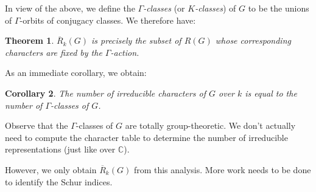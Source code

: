 \documentclass[12pt]{article}
\theoremstyle{plain}
\newtheorem{theorem}{Theorem}[section]
\newtheorem{corollary}[theorem]{Corollary}
\theoremstyle{definition}
\theoremstyle{remark}
\numberwithin{equation}{section}
\begin{document}
In view of the above, we define the \emph{$\Gamma$-classes}
(or \emph{$K$-classes}) of $G$ to be the unions of $\Gamma$-orbits of
conjugacy classes.
We therefore have:

\begin{theorem}
$\overline{R}_k(G)$ is precisely the subset of $R(G)$ whose corresponding
characters are fixed by the $\Gamma$-action.
\end{theorem}

As an immediate corollary, we obtain:

\begin{corollary}
The number of irreducible characters of $G$ over $k$
is equal to the number of $\Gamma$-classes of $G$.
\end{corollary}

Observe that the $\Gamma$-classes of $G$ are totally group-theoretic.
We don't actually need to compute the character table to determine the
number of irreducible representations (just like over $\mathbb{C}$).

However, we only obtain $\overline{R}_k(G)$ from this analysis.
More work needs to be done to identify the Schur indices.



\end{document}
